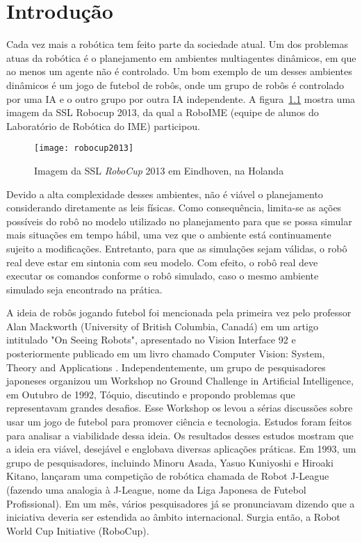 \chapter{Introdução}

Cada vez mais a robótica tem feito parte da sociedade atual. Um dos problemas
atuas da robótica é o planejamento em ambientes multiagentes dinâmicos, em que
ao menos um agente não é controlado. Um bom exemplo de um desses ambientes
dinâmicos é um jogo de futebol de robôs, onde um grupo de robôs é controlado por
uma IA e o outro grupo por outra IA independente.
A figura~\ref{fig:robocup2013} mostra uma imagem da
SSL Robocup 2013, da qual a RoboIME (equipe de alunos do Laboratório de Robótica
do IME) participou.

\begin{figure}[h]
  \centering
  \texttt{[image: robocup2013]}
  \caption{Imagem da SSL \textit{RoboCup} 2013 em Eindhoven, na Holanda}\label{fig:robocup2013}
\end{figure}

Devido a alta complexidade desses ambientes, não é viável o planejamento
considerando diretamente as leis físicas. Como consequência, limita-se as ações
possíveis do robô no modelo utilizado no planejamento para que se possa simular
mais situações em tempo hábil, uma vez que o ambiente está continuamente sujeito
a modificações. Entretanto, para que as simulações sejam válidas, o robô real
deve estar em sintonia com seu modelo. Com efeito, o robô real deve executar os
comandos conforme o robô simulado, caso o mesmo ambiente simulado seja
encontrado na prática.

A ideia de robôs jogando futebol foi mencionada pela primeira vez pelo professor
Alan Mackworth (University of British Columbia, Canadá) em um artigo intitulado
"On Seeing Robots", apresentado no Vision Interface 92 e posteriormente
publicado em um livro chamado Computer Vision: System, Theory and Applications
\cite{basu1993computer}.  Independentemente, um grupo de pesquisadores japoneses
organizou um Workshop no Ground Challenge in Artificial Intelligence, em Outubro
de 1992, Tóquio, discutindo e propondo problemas que representavam grandes
desafios.
Esse Workshop os levou a sérias discussões sobre usar um jogo de futebol para
promover ciência e tecnologia. Estudos foram feitos para analisar a viabilidade
dessa ideia. Os resultados desses estudos mostram que a ideia era viável,
desejável e englobava diversas aplicações práticas. Em 1993, um grupo de
pesquisadores, incluindo Minoru Asada, Yasuo Kuniyoshi e Hiroaki Kitano,
lançaram uma competição de robótica chamada de Robot J-League (fazendo uma
analogia à J-League, nome da Liga Japonesa de Futebol Profissional). Em um mês,
vários pesquisadores já se pronunciavam dizendo que a iniciativa deveria ser
estendida ao âmbito internacional. Surgia então, a Robot World Cup Initiative
(RoboCup).

